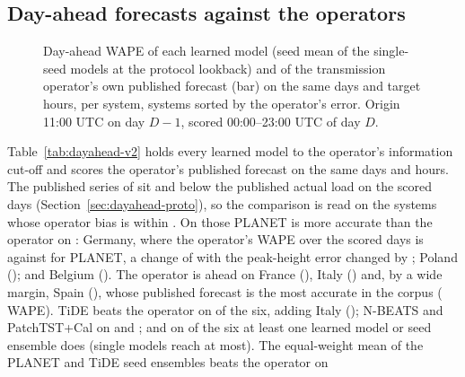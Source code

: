 \subsection{Day-ahead forecasts against the operators}
\label{sec:dayahead}
\begin{figure}[!t]
\centering
{}
\caption{Day-ahead WAPE of each learned model (seed mean of the single-seed models at the
protocol lookback) and of the transmission operator's own published forecast (bar) on the same
days and target hours, per system, systems sorted by the operator's error. Origin 11:00 UTC on
day $D-1$, scored 00:00--23:00 UTC of day $D$.}
\label{fig:dayahead}
\end{figure}

Table~\ref{tab:dayahead-v2} holds every learned model to the operator's information cut-off
and scores the operator's published forecast on the same days and hours. The published series
of  sit  and
 below the published actual load on the scored days
(Section~\ref{sec:dayahead-proto}), so the comparison is read on the 
systems whose operator bias is within . On those PLANET is more
accurate than the operator on : Germany, where the
operator's WAPE over the  scored days is  against
 for PLANET, a change of  with
the peak-height error changed by ; Poland
(); and Belgium (). The
operator is ahead on France (), Italy
() and, by a wide margin, Spain
(), whose published forecast is the most accurate in the
corpus ( WAPE). TiDE beats the operator on
 of the six, adding Italy
(); N-BEATS and PatchTST+Cal on
 and ; and on  of the six at least one learned model or seed
ensemble does (single models reach  at most). The
equal-weight mean of the PLANET and TiDE seed ensembles beats the operator on

